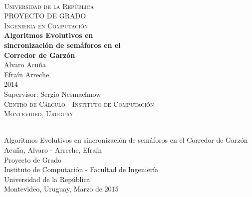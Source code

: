 \begin{titlepage}
  \thispagestyle{empty}
  \begin{center}
    ~\\[2.2cm]



    \textsc{\Huge Universidad de la República } \\[2.5cm]
    \textsc{\Huge PROYECTO DE GRADO } \\[0.5cm]
    \textsc{\Huge Ingeniería en Computación } \\[2.5cm]    
    \textbf{\Huge Algoritmos Evolutivos en } \\[0.2cm]
    \textbf{\Huge sincronización de semáforos en el } \\[0.3cm]
    \textbf{\Huge Corredor de Garzón } \\[1.5cm]    
    
    {\huge Alvaro Acuña} \\[0.2cm]
    {\huge Efraín Arreche} \\[0.2cm]
    {\Large 2014} \\[2.0cm]
    {\Large Supervisor: Sergio Nesmachnow} \\[1.0cm]

    \textsc{\large Centro de Cálculo - Instituto de Computación} \\[0.2cm]
    \textsc{\large Montevideo, Uruguay} \\[1.5cm]

  \end{center}
  \vfill
\end{titlepage}
{
  \thispagestyle{empty}
  ~\\[16cm]
  Algoritmos Evolutivos en sincronización de semáforos en el Corredor de Garzón \\[0.05cm]
  Acuña, Alvaro - Arreche, Efraín \\[0.05cm]
  Proyecto de Grado \\[0.05cm]
  Instituto de Computación - Facultad de Ingeniería \\[0.05cm]
  Universidad de la República \\[0.05cm]
  Montevideo, Uruguay, Marzo de 2015 \\[0.05cm]
  \vfill
  \cleardoublepage
}
\setcounter{page}{1}